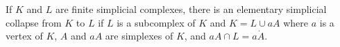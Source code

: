 If $K$ and $L$ are finite simplicial complexes, there is an elementary simplicial collapse from $K$ to $L$ if $L$ is a subcomplex of $K$ and $K = L \cup aA$ where $a$ is a vertex of $K$, $A$ and $aA$ are simplexes of $K$, and $aA \cap L = a\dot{A}$.
